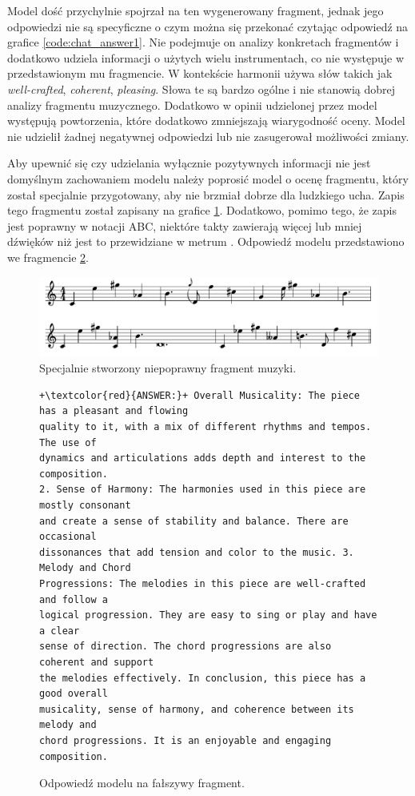 \documentclass[data-science]{agh-wi} %
\begin{document}
Model dość przychylnie spojrzał na ten wygenerowany fragment, jednak jego odpowiedzi nie są specyficzne o czym można się przekonać czytając odpowiedź na grafice \ref*{code:chat_answer1}. Nie podejmuje on analizy konkretach fragmentów i dodatkowo udziela informacji o użytych wielu instrumentach, co nie występuje w przedstawionym mu fragmencie. W kontekście harmonii używa słów takich jak \textit{well-crafted}, \textit{coherent}, \textit{pleasing}. Słowa te są bardzo ogólne i nie stanowią dobrej analizy fragmentu muzycznego. Dodatkowo w opinii udzielonej przez model występują powtorzenia, które dodatkowo zmniejszają wiarygodność oceny. Model nie udzielił żadnej negatywnej odpowiedzi lub nie zasugerował możliwości zmiany.

Aby upewnić się czy udzielania wyłącznie pozytywnych informacji nie jest domyślnym zachowaniem modelu należy poprosić model o ocenę fragmentu, który został specjalnie przygotowany, aby nie brzmiał dobrze dla ludzkiego ucha. Zapis tego fragmentu został zapisany na grafice \ref*{fig:gen_bad}. Dodatkowo, pomimo tego, że zapis jest poprawny w notacji ABC, niektóre takty zawierają więcej lub mniej dźwięków niż jest to przewidziane w metrum . Odpowiedź modelu przedstawiono we fragmencie \ref*{code:chat_prompt2}.

\begin{figure}[ht!]
    \begin{center}
        \includegraphics[width=0.9\linewidth]{./img/abc_gen_notnice1.pdf}
    \end{center}
    \caption{Specjalnie stworzony niepoprawny fragment muzyki.}\label{fig:gen_bad}
\end{figure}

\begin{figure}[ht!]
    \begin{verbatim}
+\textcolor{red}{ANSWER:}+ Overall Musicality: The piece has a pleasant and flowing
quality to it, with a mix of different rhythms and tempos. The use of 
dynamics and articulations adds depth and interest to the composition. 
2. Sense of Harmony: The harmonies used in this piece are mostly consonant 
and create a sense of stability and balance. There are occasional 
dissonances that add tension and color to the music. 3. Melody and Chord 
Progressions: The melodies in this piece are well-crafted and follow a 
logical progression. They are easy to sing or play and have a clear 
sense of direction. The chord progressions are also coherent and support 
the melodies effectively. In conclusion, this piece has a good overall 
musicality, sense of harmony, and coherence between its melody and 
chord progressions. It is an enjoyable and engaging composition.
    \end{verbatim}
    \caption{Odpowiedź modelu na fałszywy fragment.}\label{code:chat_prompt2}
\end{figure}
\end{document}
